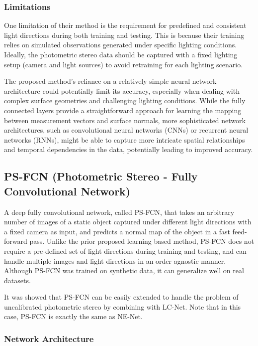 \subsubsection{Limitations}

One limitation of their method is the requirement for predefined and consistent light directions during both training and testing. This is because their training relies on simulated observations generated under specific lighting conditions. Ideally, the photometric stereo data should be captured with a fixed lighting setup (camera and light sources) to avoid retraining for each lighting scenario. 

The proposed method's reliance on a relatively simple neural network architecture could potentially limit its accuracy, especially when dealing with complex surface geometries and challenging lighting conditions. While the fully connected layers provide a straightforward approach for learning the mapping between measurement vectors and surface normals, more sophisticated network architectures, such as convolutional neural networks (CNNs) or recurrent neural networks (RNNs), might be able to capture more intricate spatial relationships and temporal dependencies in the data, potentially leading to improved accuracy.

\subsection{PS-FCN (Photometric Stereo - Fully Convolutional Network)}
A deep fully convolutional network\cite{ps-fcn}, called PS-FCN, that takes an arbitrary number of images of a static object captured under different light directions with a fixed camera as input, and predicts a normal map of the object in a fast feed-forward pass. Unlike the prior proposed learning based method, PS-FCN does not require a pre-defined set of light directions during training and testing, and can handle multiple images and light directions in an order-agnostic manner. Although PS-FCN was trained on synthetic data, it can generalize well on real datasets. 

It was showed that PS-FCN can be easily extended to handle the problem of uncalibrated photometric stereo by combining with LC-Net. Note that in this case, PS-FCN is exactly the same as NE-Net.



\subsubsection{Network Architecture}

